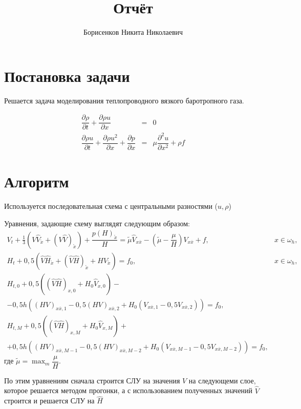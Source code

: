 \documentclass[12pt,a4paper]{article}
\author{Борисенков Никита Николаевич}
\title{Отчёт}
\newcommand{\xo}{\mathring{x}}
\newcommand{\xx}{x\overline{x}}
\newcommand{\pd}[2]{\dfrac{\partial #1}{\partial #2}}
\begin{document}
\maketitle
\section{Постановка задачи}

Решается задача моделирования теплопроводного вязкого баротропного газа.

$$
\begin{array}{rcl}
    \pd{\rho}{t} + \pd{\rho u}{x} & = & 0\\
    \pd{\rho u}{t} + \pd{\rho u^2}{x} + \pd{p}{x} & = & \mu\pd{^2 u}{x^2} + \rho f
\end{array}
$$

\section{Алгоритм}

Используется последовательная схема с центральными разностями ($u, \rho$)

Уравнения, задающие схему выглядят следующим образом:
$$
\begin{array}{lc}
    V_t + \frac13 \left( V\hat{V}_{\xo} + \left( V\hat{V} \right)_{\xo} \right) + \dfrac{p\left(H\right)_{\xo}}{H} = \tilde{\mu}\hat{V}_{\xx} - \left( \tilde{\mu} - \dfrac{\mu}{H} \right)V_{\xx} + f, & x \in \omega_h, \\

    H_t + 0,\!5 \left(  \hat{V}\hat{H}_{\xo} + \left(\hat{V}\hat{H}\right)_{\xo} + H\hat{V}_{\xo}\right) = f_0, & x \in \omega_h, \\

    H_{t,0} + 0,\!5\left(\left(\hat{V}\hat{H}\right)_{x,0} + H_0\hat{V}_{x,0}\right) - & \\
    - 0,\!5h\left(\left(HV\right)_{\xx,1} - 0,\!5\left(HV\right)_{\xx,2} + H_0\left(V_{\xx,1} - 0,\!5V_{\xx,2}\right)\right) = f_0, & \\

    H_{t,M} + 0,\!5\left(\left(\hat{V}\hat{H}\right)_{x,M} + H_0\hat{V}_{x,M}\right) + & \\
    + 0,\!5h\left(\left(HV\right)_{\xx,M-1} - 0,\!5\left(HV\right)_{\xx,M-2} + H_0\left(V_{\xx,M-1} - 0,\!5V_{\xx,M-2}\right)\right) = f_0, & 
\end{array}
$$
где $\tilde{\mu} = \displaystyle\max_{m} \dfrac{\mu}{H}$.

По этим уравнениям сначала строится СЛУ на значения $V$ на следующеми слое, которое решается методом прогонки, а с использованием полученных значений $\hat{V}$ строится и решается СЛУ на $\hat{H}$
\end{document}
